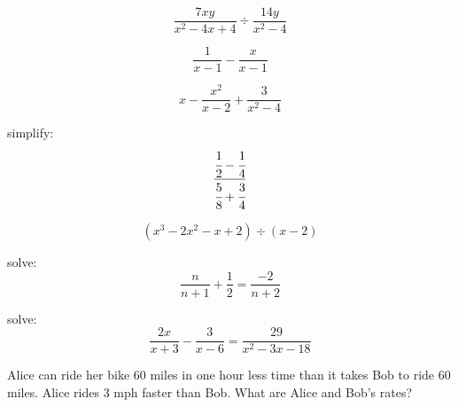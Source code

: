 \documentclass[fleqn,addpoints]{exam}
\begin{document}
\begin{questions}
\question 
\[ \displaystyle \frac{7xy}{x^2 - 4x + 4} \div \frac{14y}{x^2 - 4} \]


\question \[ \displaystyle \frac{1}{x-1} - \frac{x}{x-1} \]

\question \[ \displaystyle x - \frac{x^2}{x-2} + \frac{3}{x^2-4} \]

\question simplify: \[ \displaystyle \frac{\cfrac{1}{2} - \cfrac{1}{4}}{\cfrac{5}{8} + \cfrac{3}{4}} \]

\question \[ (x^3 - 2x^2 - x + 2) \div (x-2)\]

\question solve: \[ \displaystyle \frac{n}{n+1} + \frac{1}{2} = \frac{-2}{n+2}\]

\question solve: \[ \displaystyle \frac{2x}{x+3} - \frac{3}{x-6} = \frac{29}{x^2-3x-18} \]

\question
Alice can ride her bike 60 miles in one hour less time than it takes Bob to ride 60 miles.  Alice rides 3 mph faster than
Bob.  What are Alice and Bob's rates?

\end{questions}
\end{document}
